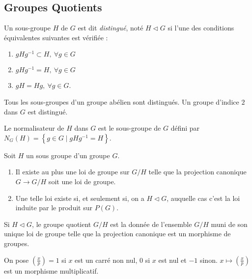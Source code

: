 \documentclass{cours}
\begin{document}
\subsection{Groupes Quotients}
\begin{definition}
    Un sous-groupe $H$ de $G$ est dit \emph{distingué}, noté $H \lhd G$ si l'une des conditions équivalentes suivantes est vérifiée : 
    \begin{enumerate}
        \item $gHg^{-1} \subset H,\ \forall g \in G$
        \item $gHg^{-1} = H,\ \forall g \in G$
        \item $gH = Hg, \ \forall g \in G$.
    \end{enumerate}
\end{definition}

\begin{remark}
    Tous les sous-groupes d'un groupe abélien sont distingués. Un groupe d'indice $2$ dans $G$ est distingué.
\end{remark}
\begin{definition}
    Le normalisateur de $H$ dans $G$ est le sous-groupe de $G$ défini par $N_{G}(H) = \left\{g \in G \mid gHg^{-1} = H\right\}$.
\end{definition}

\begin{theorem}
    Soit $H$ un sous groupe d'un groupe $G$. 
    \begin{enumerate}
        \item Il existe au plus une loi de groupe sur $G/H$ telle que la projection canonique $G \rightarrow G/H$ soit une loi de groupe. 
        \item Une telle loi existe si, et seulement si, on a $H \lhd G$, auquelle cas c'est la loi induite par le produit sur $P(G)$.
    \end{enumerate}
\end{theorem}

\begin{definition}
    Si $H \lhd G$, le groupe quotient $G/H$ est la donnée de l'ensemble $G/H$ muni de son unique loi de groupe telle que la projection canonique est un morphisme de groupes.
\end{definition}

\begin{definition}
    On pose $\left(\frac{x}{p}\right) = 1$ si $x$ est un carré non nul, $0$ si $x$ est nul et $-1$ sinon. $x \mapsto \left(\frac{x}{p}\right)$ est un morphisme multiplicatif. 
\end{definition}
\end{document}
